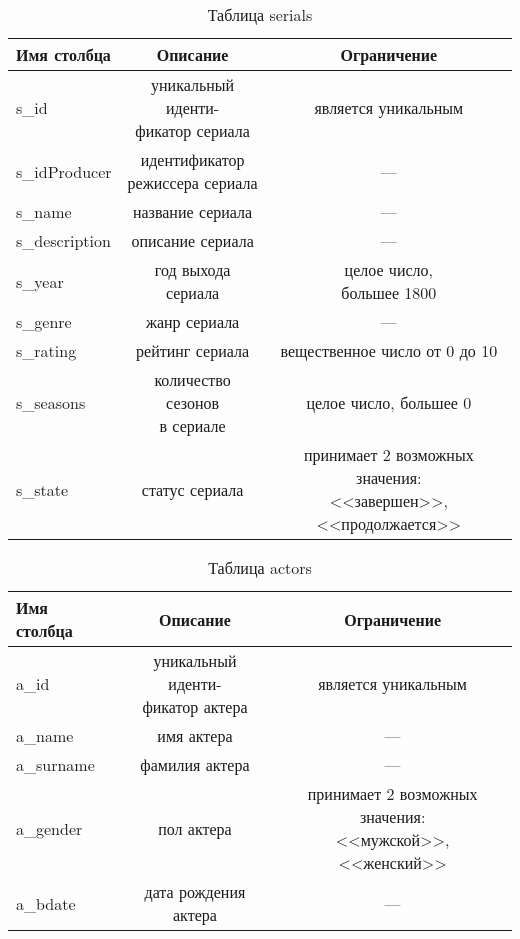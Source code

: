 \begin{table}[H]
    \begin{center}
        \caption{Таблица serials}
        \label{tbl:serials}
        \begin{tabular}{|l|c|c|}
            \hline
            Имя столбца & Описание & Ограничение \\ \hline
            s\_id & \makecell{уникальный иденти-\\фикатор сериала} & является уникальным \\ \hline
            s\_idProducer & \makecell{идентификатор\\режиссера сериала} & --- \\ \hline
            s\_name & название сериала & --- \\ \hline
            s\_description & описание сериала & --- \\ \hline
            s\_year & год выхода сериала & \makecell{целое число,\\большее 1800} \\ \hline
            s\_genre & жанр сериала & --- \\ \hline
            s\_rating & рейтинг сериала & вещественное число от 0 до 10 \\ \hline
            s\_seasons & \makecell{количество сезонов\\в сериале} & целое число, большее 0 \\ \hline
            s\_state & статус сериала & \makecell{принимает 2 возможных значения:\\<<завершен>>, <<продолжается>>}\\ \hline
        \end{tabular}
    \end{center}
\end{table}

\begin{table}[H]
    \begin{center}
        \caption{Таблица actors}
        \label{tbl:actors}
        \begin{tabular}{|l|c|c|}
            \hline
            Имя столбца & Описание & Ограничение \\ \hline
            a\_id & \makecell{уникальный иденти-\\фикатор актера} & является уникальным \\ \hline
            a\_name & имя актера & --- \\ \hline
            a\_surname & фамилия актера & --- \\ \hline
            a\_gender & пол актера & \makecell{принимает 2 возможных значения:\\<<мужской>>, <<женский>>} \\ \hline
            a\_bdate & дата рождения актера & --- \\ \hline
        \end{tabular}
    \end{center}
\end{table}

